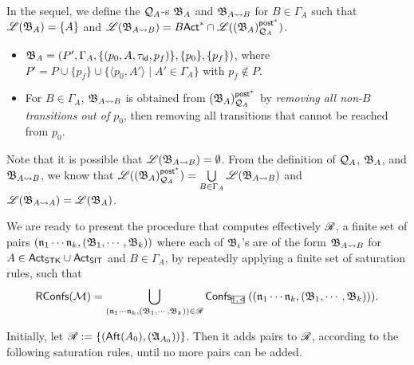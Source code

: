 In the sequel, we define the ${\mathcal{Q} }_{A}$-{\WOTrNFA}s ${\mathfrak{B} }_{A}$ and ${\mathfrak{B} }_{A\rightsquigarrow B}$ for $B \in \Gamma_A$ such that ${\mathscr{L} }({\mathfrak{B} }_A) = \{A\}$ and ${\mathscr{L} }({\mathfrak{B} }_{A\rightsquigarrow B}) =B{\sf Act}^* \cap {\mathscr{L} }(({\mathfrak{B} }_{A})^{{\mathsf{post} }^*}_{{\mathcal{Q} }_A})$. 
\begin{itemize}
    \item ${\mathfrak{B} }_{A} = (P', \Gamma_A, \{(p_0, A,\tau_{\mathsf{id}}, p_f)\},\{p_0\},\{p_f\} )$, where $P' = P \cup \{p_f\} \cup \{\langle p_0,A'\rangle \mid A'\in\Gamma_A\}$ with $p_f \not \in P$.  
    \item For $B \in \Gamma_A$, ${\mathfrak{B} }_{A\rightsquigarrow B}$ is obtained from $({\mathfrak{B} }_{A})^{{\mathsf{post} }^*}_{{\mathcal{Q} }_A}$ by \emph{removing all non-$B$ transitions out of $p_0$}, then removing all transitions that cannot be reached from $p_0$. 
\end{itemize}
Note that it is possible that ${\mathscr{L} }({\mathfrak{B} }_{A\rightsquigarrow B}) = \emptyset$.
From the definition of ${\mathcal{Q} }_A$, ${\mathfrak{B} }_A$, and ${\mathfrak{B} }_{A\rightsquigarrow B}$, we know that ${\mathscr{L} }(({\mathfrak{B} }_A)^{{\mathsf{post} }^*}_{{\mathcal{Q} }_A}) = \bigcup\limits_{B\in\Gamma_A} {\mathscr{L} }({\mathfrak{B} }_{A\rightsquigarrow B})$ and ${\mathscr{L} }({\mathfrak{B} }_{A\rightsquigarrow A}) = {\mathscr{L} }({\mathfrak{B} }_A)$. 

We are ready to present the procedure that computes effectively $\mathscr{R}$, a finite set of pairs $(\mathfrak{n}_1 \cdots \mathfrak{n}_k, ({\mathfrak{B} }_1, \cdots, {\mathfrak{B} }_k))$ where each of ${\mathfrak{B} }_i$'s are of the form ${\mathfrak{B} }_{A\rightsquigarrow B}$ for $A \in {\sf Act}_{\sf STK}\cup{\sf Act}_{\sf SIT}$ and $B \in \Gamma_A$, by repeatedly applying a finite set of saturation rules, such that
\[\RConfs(\Mm) = \bigcup \limits_{(\aname_1 \cdots \aname_k, (\AutB_1, \cdots, \AutB_k)) \in \AutReach} \confs_{\mhcancel{\dag,\triangleleft}}((\aname_1 \cdots \aname_k, (\AutB_1, \cdots, \AutB_k))).\]

Initially, let $\mathscr{R} := \{({\sf Aft}(A_0),({\mathfrak{A} }_{A_0}))\}$.
Then it adds pairs to $\mathscr{R}$, according to the following saturation rules, until no more pairs can be added. 


